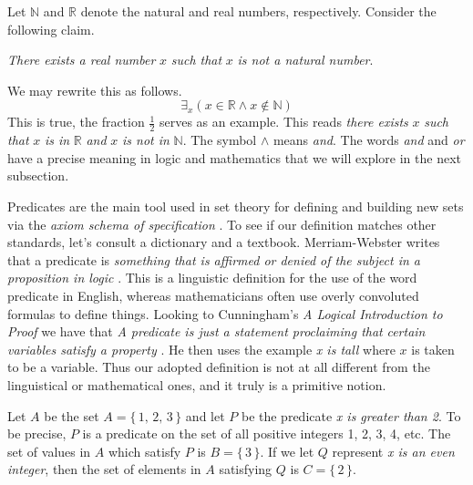             \begin{example}
                Let $\mathbb{N}$ and $\mathbb{R}$ denote the natural and real
                numbers, respectively. Consider the following claim.
                \begin{center}
                    \textit{There exists a real number} $x$
                    \textit{such that} $x$ \textit{is not a natural number}.
                \end{center}
                We may rewrite this as follows.
                \begin{equation}
                    \exists_{x}(x\in\mathbb{R}\land{x}\notin\mathbb{N})
                \end{equation}
                This is true, the fraction $\frac{1}{2}$ serves as an example.
                This reads \textit{there exists} $x$ \textit{such that}
                $x$ \textit{is in} $\mathbb{R}$ \textit{and} $x$
                \textit{is not in} $\mathbb{N}$. The symbol $\land$ means
                \textit{and}. The words \textit{and} and \textit{or} have a
                precise meaning in logic and mathematics that we will explore
                in the next subsection.
            \end{example}
            Predicates are the main tool used in set theory for defining and
            building new sets via the \textit{axiom schema of specification}%
            . To see if our definition
            matches other standards, let's consult a dictionary and a textbook.
            Merriam-Webster writes that a predicate is
            \textit{something that is affirmed or denied of the subject in a}
            \textit{proposition in logic} \cite{MerriamWebsterPredicateDef}.
            This is a linguistic definition for the use of the word predicate
            in English, whereas mathematicians often use overly convoluted
            formulas to define things. Looking to Cunningham's
            \textit{A Logical Introduction to Proof} we have that
            \textit{A predicate is just a statement proclaiming that}
            \textit{certain variables satisfy a property}
            \cite{Cunningham2010}. He then uses the example \textit{x is tall}
            where $x$ is taken to be a variable. Thus our adopted definition is
            not at all different from the linguistical or mathematical ones,
            and it truly is a primitive notion.
            \begin{example}
                Let $A$ be the set $A=\{\,1,\,2,\,3\,\}$ and let $P$ be the
                predicate \textit{x is greater than 2}. To be precise, $P$ is a
                predicate on the set of all positive integers 1, 2, 3, 4, etc.
                The set of values in $A$ which satisfy $P$ is $B=\{\,3\,\}$. If
                we let $Q$ represent \textit{x is an even integer}, then the
                set of elements in $A$ satisfying $Q$ is $C=\{\,2\,\}$.
            \end{example}
